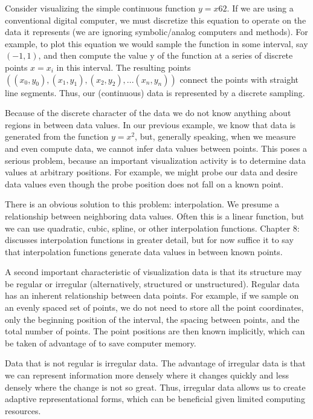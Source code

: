 Consider visualizing the simple continuous function $y = x6 2$. If we are using a conventional digital computer, we must discretize this equation to operate on the data it represents (we are ignoring symbolic/analog computers and methods). For example, to plot this equation we would sample the function in some interval, say $(-1,1)$, and then compute the value y of the function at a series of discrete points $x = x_i$ in this interval. The resulting points $((x_0,y_0), (x_1,y_1), (x_2,y_2), ... (x_n,y_n))$ connect the points with straight line segments. Thus, our (continuous) data is represented by a discrete sampling.

Because of the discrete character of the data we do not know anything about regions in between data values. In our previous example, we know that data is generated from the function $y = x^2$, but, generally speaking, when we measure and even compute data, we cannot infer data values between points. This poses a serious problem, because an important visualization activity is to determine data values at arbitrary positions. For example, we might probe our data and desire data values even though the probe position does not fall on a known point.

There is an obvious solution to this problem: interpolation. We presume a relationship between neighboring data values. Often this is a linear function, but we can use quadratic, cubic, spline, or other interpolation functions. Chapter 8:  discusses interpolation functions in greater detail, but for now suffice it to say that interpolation functions generate data values in between known points.

A second important characteristic of visualization data is that its structure may be regular or irregular (alternatively, structured or unstructured). Regular data has an inherent relationship between data points. For example, if we sample on an evenly spaced set of points, we do not need to store all the point coordinates, only the beginning position of the interval, the spacing between points, and the total number of points. The point positions are then known implicitly, which can be taken of advantage of to save computer memory.

Data that is not regular is irregular data. The advantage of irregular data is that we can represent information more densely where it changes quickly and less densely where the change is not so great. Thus, irregular data allows us to create adaptive representational forms, which can be beneficial given limited computing resources.

